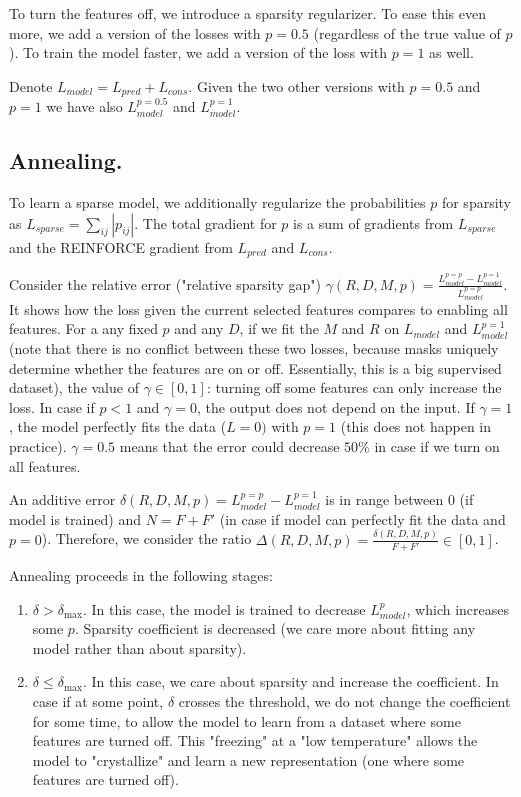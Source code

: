 \documentclass[a4paper,11pt,oneside]{report}
\begin{document}
To turn the features off, we introduce a sparsity regularizer. To ease this even more, we add a version of the losses with $p=0.5$ (regardless of the true value of $p$). To train the model faster, we add a version of the loss with $p=1$ as well.

Denote $L_{model}=L_{pred}+L_{cons}$. Given the two other versions with $p=0.5$ and $p=1$ we have also $L_{model}^{p=0.5}$ and $L_{model}^{p=1}$.

\subsection{Annealing.} To learn a sparse model, we additionally regularize the probabilities $p$ for sparsity as $L_{sparse}=\sum_{ij}|p_{ij}|$. The total gradient for $p$ is a sum of gradients from $L_{sparse}$ and the REINFORCE gradient from $L_{pred}$ and $L_{cons}$.

Consider the relative error ("relative sparsity gap") $\gamma(R, D, M, p)=\frac{L_{model}^{p=p}-L_{model}^{p=1}}{L_{model}^{p=p}}$. It shows how the loss given the current selected features compares to enabling all features. For a any fixed $p$ and any $D$, if we fit the $M$ and $R$ on $L_{model}$ and $L_{model}^{p=1}$ (note that there is no conflict between these two losses, because masks uniquely determine whether the features are on or off. Essentially, this is a big supervised dataset), the value of $\gamma\in[0, 1]$: turning off some features can only increase the loss. In case if $p<1$ and $\gamma=0$, the output does not depend on the input. If $\gamma=1$, the model perfectly fits the data ($L=0)$ with $p=1$ (this does not happen in practice). $\gamma=0.5$ means that the error could decrease $50\%$ in case if we turn on all features.

An additive error $\delta(R, D, M, p)=L_{model}^{p=p}-L_{model}^{p=1}$ is in range between $0$ (if model is trained) and $N=F+F'$ (in case if model can perfectly fit the data and $p=0$). Therefore, we consider the ratio $\Delta(R, D, M, p)=\frac{\delta(R, D, M, p)}{F+F'}\in[0, 1]$.

Annealing proceeds in the following stages:
\begin{enumerate}
    \item $\delta>\delta_{\max}$. In this case, the model is trained to decrease $L_{model}^p$, which increases some $p$. Sparsity coefficient is decreased (we care more about fitting any model rather than about sparsity).
    \item $\delta\leq \delta_{\max}$. In this case, we care about sparsity and increase the coefficient. In case if at some point, $\delta$ crosses the threshold, we do not change the coefficient for some time, to allow the model to learn from a dataset where some features are turned off. This "freezing" at a "low temperature" allows the model to "crystallize" and learn a new representation (one where some features are turned off).
\end{enumerate}
\end{document}
